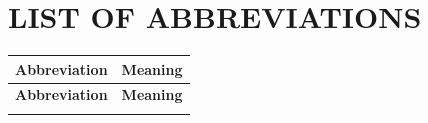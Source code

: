 \chapter*{LIST OF ABBREVIATIONS}
{}

\renewcommand{\arraystretch}{1.25}
\begin{center}
\begin{longtable}{p{3.2cm}p{10.6cm}}
  \toprule
  \textbf{Abbreviation} & \multicolumn{1}{c}{\textbf{Meaning}} \\
  \midrule
  \endfirsthead

  \toprule
  \textbf{Abbreviation} & \multicolumn{1}{c}{\textbf{Meaning}} \\
  \midrule
  \endhead

  \bottomrule
  \endfoot

  \bottomrule
  \endlastfoot


\end{longtable}
\end{center}
